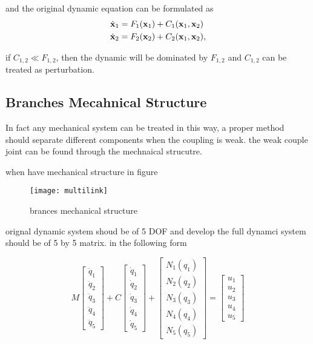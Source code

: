 and  the original dynamic equation can be formulated as
\begin{align}
\dot{\mathbf{x}}_1&=F_1(\mathbf{x}_1)+C_1(\mathbf{x}_1,\mathbf{x}_2)\nonumber\\
\dot{\mathbf{x}}_2&=F_2(\mathbf{x}_2)+C_2(\mathbf{x}_1,\mathbf{x}_2),\nonumber
\end{align}

if $C_{1,2} \ll F_{1,2}$, then the dynamic will be dominated by $F_{1,2}$ and $C_{1,2}$ can be treated as perturbation.
\subsection*{Branches Mecahnical Structure}
In fact any mechanical system can be treated in this way,
a proper method should separate different components when the coupling is weak.
the weak couple joint can be found through the mechnaical strucutre.

when have mechanical structure in figure
\begin{figure}[!htbp]
  \begin{center}
      \texttt{[image: multilink]}
    \caption{brances mechanical structure}
    \label{fig:branches structure}
\end{center}
\end{figure}

orignal dynamic system shoud be of 5 DOF and develop the full dynamci system should be of 5 by 5 matrix.
in the following form


\[
M\left[\begin{array}{c}
\ddot{q}_{1}\\
\ddot{q}_{2}\\
\ddot{q}_{3}\\
\ddot{q}_{4}\\
\ddot{q}_{5}\end{array}\right]+C\left[\begin{array}{c}
\dot{q}_{1}\\
\dot{q}_{2}\\
\dot{q}_{3}\\
\dot{q}_{4}\\
\dot{q}_{5}\end{array}\right]+\left[\begin{array}{c}
N_{1}(q_{1})\\
N_{2}(q_{2})\\
N_{3}(q_{3})\\
N_{4}(q_{4})\\
N_{5}(q_{5})\end{array}\right]=\left[\begin{array}{c}
u_{1}\\
u_{2}\\
u_{3}\\
u_{4}\\
u_{5}\end{array}\right]
\]

